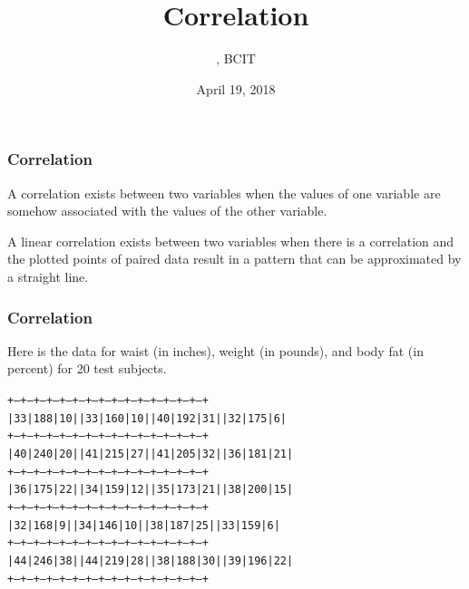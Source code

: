 \documentclass[xcolor=dvipsnames]{beamer}
\title{Correlation}
\subtitle{{\CourseNumber}, BCIT}
\author{\CourseName}
\date{April 19, 2018}
\begin{document}
\begin{frame}
  \titlepage
\end{frame}

\begin{frame}
  \frametitle{Correlation}
  A \alert{correlation} exists between two variables when the values of
  one variable are somehow associated with the values of the other
  variable.

  \bigskip

    A \alert{linear correlation} exists between two variables when
    there is a correlation and the plotted points of paired data
    result in a pattern that can be approximated by a straight line.
\end{frame}

\begin{frame}
  \frametitle{Correlation}
  Here is the data for waist (in inches), weight (in pounds), and body
  fat (in percent) for 20 test subjects.


\begin{alltt}
\scriptsize
+---+---+---+---+---+---+---+---+---+---+---+---+---+---+---+
| 33|188| 10|   | 33|160| 10|   | 40|192| 31|   | 32|175|  6|
+---+---+---+---+---+---+---+---+---+---+---+---+---+---+---+
| 40|240| 20|   | 41|215| 27|   | 41|205| 32|   | 36|181| 21|
+---+---+---+---+---+---+---+---+---+---+---+---+---+---+---+
| 36|175| 22|   | 34|159| 12|   | 35|173| 21|   | 38|200| 15|
+---+---+---+---+---+---+---+---+---+---+---+---+---+---+---+
| 32|168|  9|   | 34|146| 10|   | 38|187| 25|   | 33|159|  6|
+---+---+---+---+---+---+---+---+---+---+---+---+---+---+---+
| 44|246| 38|   | 44|219| 28|   | 38|188| 30|   | 39|196| 22|
+---+---+---+---+---+---+---+---+---+---+---+---+---+---+---+
\end{alltt}
\end{frame}
\end{document}
